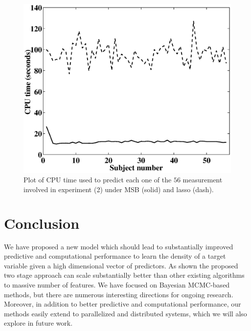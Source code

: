 \documentclass{article} %
\begin{document}
\begin{figure}[h!]
\centering
\includegraphics[width=1.0\linewidth]{Time_real2.eps}
\caption{Plot of CPU time used to predict each one of the $56$ measurement involved in experiment (2) under MSB (solid) and lasso (dash).} \label{fig:real}
\end{figure}

\section{Conclusion}
We have proposed a new model which should lead to substantially improved predictive and computational performance to learn the density of a target variable given a high dimensional vector of predictors. As shown the proposed two stage approach can scale substantially better than other existing algorithms to massive number of features. We have focused on Bayesian MCMC-based methods, but there are numerous interesting directions for ongoing research. Moreover, in addition to better predictive and computational performance, our methods easily extend to parallelized and distributed systems, which we will also explore in future work.
\end{document}
